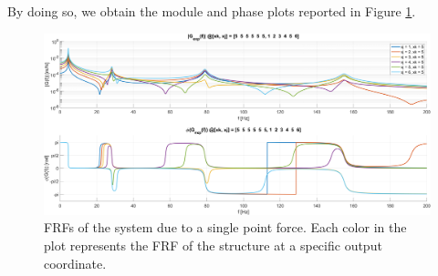 By doing so, we obtain the module and phase plots reported in Figure \ref{fig:FRFs_single_point_force}.

\begin{figure}[H]
    \centering
    \includegraphics[width=\textwidth]{img/MATLAB/Part_A/Experimental_FRF_SIMO.png}
    \caption{FRFs of the system due to a single point force. Each color in the plot represents the FRF of the structure at a specific output coordinate.}
    \label{fig:FRFs_single_point_force}
\end{figure}
